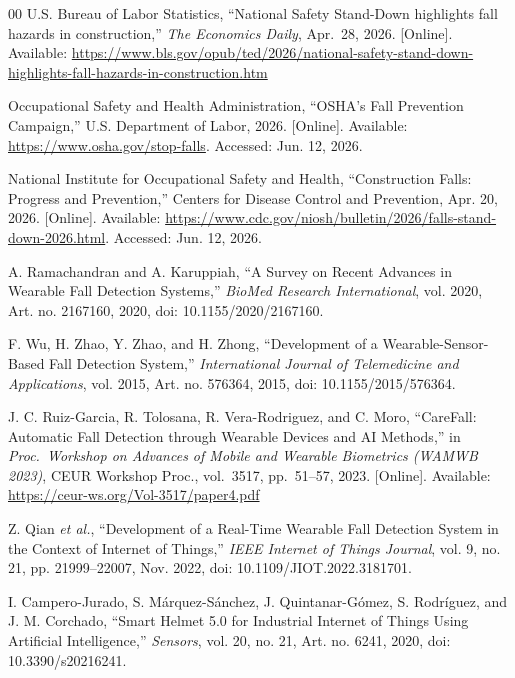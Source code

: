 \documentclass[conference]{IEEEtran}
\begin{document}
\begin{thebibliography}{00}
 U.S. Bureau of Labor Statistics, ``National Safety Stand-Down highlights fall hazards in construction,'' \emph{The Economics Daily}, Apr.\ 28, 2026. [Online]. Available: \url{https://www.bls.gov/opub/ted/2026/national-safety-stand-down-highlights-fall-hazards-in-construction.htm}

 Occupational Safety and Health Administration, ``OSHA's Fall Prevention Campaign,'' U.S. Department of Labor, 2026. [Online]. Available: \url{https://www.osha.gov/stop-falls}. Accessed: Jun. 12, 2026.

 National Institute for Occupational Safety and Health, ``Construction Falls: Progress and Prevention,'' Centers for Disease Control and Prevention, Apr. 20, 2026. [Online]. Available: \url{https://www.cdc.gov/niosh/bulletin/2026/falls-stand-down-2026.html}. Accessed: Jun. 12, 2026.

 A. Ramachandran and A. Karuppiah, ``A Survey on Recent Advances in Wearable Fall Detection Systems,'' \emph{BioMed Research International}, vol. 2020, Art. no. 2167160, 2020, doi: 10.1155/2020/2167160.

 F. Wu, H. Zhao, Y. Zhao, and H. Zhong, ``Development of a Wearable-Sensor-Based Fall Detection System,'' \emph{International Journal of Telemedicine and Applications}, vol. 2015, Art. no. 576364, 2015, doi: 10.1155/2015/576364.

 J. C. Ruiz-Garcia, R. Tolosana, R. Vera-Rodriguez, and C. Moro, ``CareFall: Automatic Fall Detection through Wearable Devices and AI Methods,'' in \emph{Proc.\ Workshop on Advances of Mobile and Wearable Biometrics (WAMWB 2023)}, CEUR Workshop Proc., vol.\ 3517, pp.\ 51--57, 2023. [Online]. Available: \url{https://ceur-ws.org/Vol-3517/paper4.pdf}

 Z. Qian \emph{et al.}, ``Development of a Real-Time Wearable Fall Detection System in the Context of Internet of Things,'' \emph{IEEE Internet of Things Journal}, vol. 9, no. 21, pp. 21999--22007, Nov. 2022, doi: 10.1109/JIOT.2022.3181701.

 I. Campero-Jurado, S. Márquez-Sánchez, J. Quintanar-Gómez, S. Rodríguez, and J. M. Corchado, ``Smart Helmet 5.0 for Industrial Internet of Things Using Artificial Intelligence,'' \emph{Sensors}, vol. 20, no. 21, Art. no. 6241, 2020, doi: 10.3390/s20216241.


\end{thebibliography}
\end{document}
